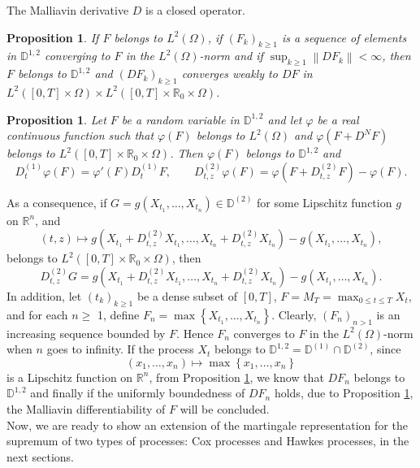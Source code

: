 \documentclass[11pt]{article}
\numberwithin{equation}{section}
\newtheorem{Proposition}[Theorem]{Proposition}
\begin{document}
The Malliavin derivative $D$ is a closed operator.
\begin{Proposition}\label{closed}\cite{nualart}
 If $F$ belongs to $L^{2}(\Omega)$, if $\left(F_{k}\right)_{k \geq 1}$ is a sequence of elements in $\mathbb{D}^{1,2}$ converging to $F$ in the $L^{2}(\Omega)$-norm and if $\sup _{k \geq 1}\left\|D F_{k}\right\|<\infty$, then $F$ belongs to $\mathbb{D}^{1,2}$ and $\left(D F_{k}\right)_{k \geq 1}$ converges weakly to $D F$ in $L^{2}([0,T] \times \Omega) \times L^{2}([0,T] \times \mathbb{R}_0 \times \Omega)$.
\end{Proposition}


\begin{Proposition}\label{chainf}\cite{nualart}
	Let $F$ be a random variable in $\mathbb{D}^{1,2}$ and let $\varphi$ be a real continuous function such that $\varphi(F)$ belongs to $L^{2}(\Omega)$ and $\varphi(F + D^{N}F)$ belongs to $L^{2}([0,T] \times \mathbb{R}_0 \times \Omega)$. Then $\varphi(F)$ belongs to $\mathbb{D}^{1,2}$ and
	\begin{equation}
		\nonumber D_t^{(1)}\varphi(F)=\varphi'(F) D_{t}^{(1)}F, \qquad \nonumber D_{t,z}^{(2)}\varphi(F)=\varphi(F+D_{t,z}^{(2)}F)-\varphi(F).
	\end{equation}
\end{Proposition}
As a consequence, if $G=g\left(X_{t_{1}}, \ldots, X_{t_{n}}\right) \in \mathbb{D}^{(2)}$ for some Lipschitz function $g$  on $\mathbb{R}^n$, and 
$$
(t, z) \mapsto g\left(X_{t_{1}}+D^{(2)}_{t,z}X_{t_1}, \ldots, X_{t_{n}}+D^{(2)}_{t,z}X_{t_n}\right)-g\left(X_{t_{1}}, \ldots, X_{t_{n}}\right),
$$
belongs to $L^{2}([0,T] \times \mathbb{R}_0 \times \Omega)$, then
$$
D_{t, z}^{(2)} G=g\left(X_{t_{1}}+D^{(2)}_{t,z}X_{t_1}, \ldots, X_{t_{n}}+D^{(2)}_{t,z}X_{t_n}\right)-g\left(X_{t_{1}}, \ldots, X_{t_{n}}\right).
$$
In addition, let $\left(t_{k}\right)_{k \geq 1}$ be a dense subset of $[0, T]$, $F=M_{T}=\max_{0 \le t \leq T}X_t$, and for each $n \geq$ 1, define $F_{n}=\max \left\{X_{t_{1}}, \ldots, X_{t_{n}}\right\}$. Clearly, $\left(F_{n}\right)_{n>1}$ is an increasing sequence bounded by $F$. Hence $F_{n}$ converges to $F$ in the $L^{2}(\Omega)$-norm when $n$ goes to infinity. If the process $X_t$ belongs to $\mathbb{D}^{1,2}=\mathbb{D}^{(1)} \cap \mathbb{D}^{(2)}$, since
$$
\left(x_{1}, \ldots, x_{n}\right) \mapsto \max \left\{x_{1}, \ldots, x_{n}\right\}
$$
is a Lipschitz function on $\mathbb{R}^{n}$, from Proposition \ref{closed}, we know that $DF_n$  belongs to $\mathbb{D}^{1,2}$ and finally if the uniformly boundedness of $DF_n$ holds, due to Proposition \ref{chainf}, the Malliavin differentiability of $F$ will be concluded. 
\\
%
Now, we are ready to show an extension of the martingale representation for the supremum of two types of processes: Cox processes and Hawkes processes, in the next sections. 
\end{document}
